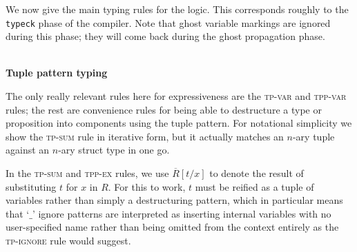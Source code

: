 \documentclass[acmsmall,nonacm]{acmart}
\DeclareMathOperator*{\Sep}{\scalerel*{\ast}{\sum}}
\newcommand{\proves}{\vdash}
\newcommand{\judgment}[2][]{\noindent\\\textbf{#1}\hspace{\stretch{1}}\fbox{$#2$}\nopagebreak}
\newcommand*{\axiom}[2][]{\infer[#1]{}{#2}}
\begin{document}
We now give the main typing rules for the logic. This corresponds roughly to the \texttt{typeck} phase of the compiler. Note that ghost variable markings are ignored during this phase; they will come back during the ghost propagation phase.

\judgment[Tuple pattern typing]{\Gamma \proves t:\tau \Rightarrow \overline{R}}

The only really relevant rules here for expressiveness are the \textsc{tp-var} and \textsc{tpp-var} rules; the rest are convenience rules for being able to destructure a type or proposition into components using the tuple pattern. For notational simplicity we show the \textsc{tp-sum} rule in iterative form, but it actually matches an $n$-ary tuple against an $n$-ary struct type in one go.

In the \textsc{tp-sum} and \textsc{tpp-ex} rules, we use $\overline{R}[t/x]$ to denote the result of substituting $t$ for $x$ in $R$. For this to work, $t$ must be reified as a tuple of variables rather than simply a destructuring pattern, which in particular means that `$\_$' ignore patterns are interpreted as inserting internal variables with no user-specified name rather than being omitted from the context entirely as the \textsc{tp-ignore} rule would suggest.
\end{document}
